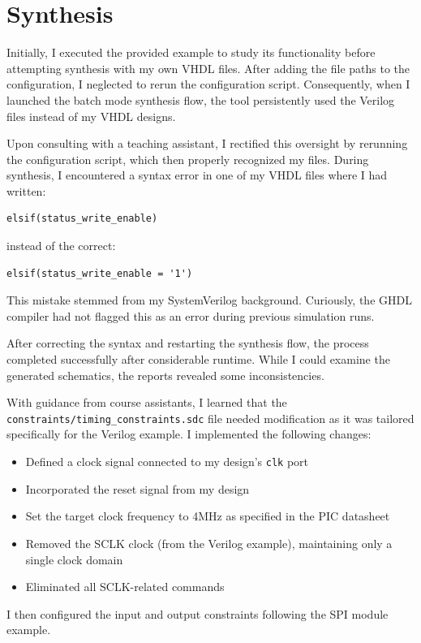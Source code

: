 \chapter{Synthesis}

Initially, I executed the provided example to study its functionality before attempting synthesis with my own VHDL files. After adding the file paths to the configuration, I neglected to rerun the configuration script. Consequently, when I launched the batch mode synthesis flow, the tool persistently used the Verilog files instead of my VHDL designs.

Upon consulting with a teaching assistant, I rectified this oversight by rerunning the configuration script, which then properly recognized my files. During synthesis, I encountered a syntax error in one of my VHDL files where I had written:
\begin{verbatim}
elsif(status_write_enable)
\end{verbatim}
instead of the correct:
\begin{verbatim}
elsif(status_write_enable = '1')
\end{verbatim}
This mistake stemmed from my SystemVerilog background. Curiously, the GHDL compiler had not flagged this as an error during previous simulation runs.

After correcting the syntax and restarting the synthesis flow, the process completed successfully after considerable runtime. While I could examine the generated schematics, the reports revealed some inconsistencies.

With guidance from course assistants, I learned that the \texttt{constraints/timing\_constraints.sdc} file needed modification as it was tailored specifically for the Verilog example. I implemented the following changes:
\begin{itemize}
    \item Defined a clock signal connected to my design's \texttt{clk} port
    \item Incorporated the reset signal from my design
    \item Set the target clock frequency to 4MHz as specified in the PIC datasheet
    \item Removed the SCLK clock (from the Verilog example), maintaining only a single clock domain
    \item Eliminated all SCLK-related commands
\end{itemize}

I then configured the input and output constraints following the SPI module example.


